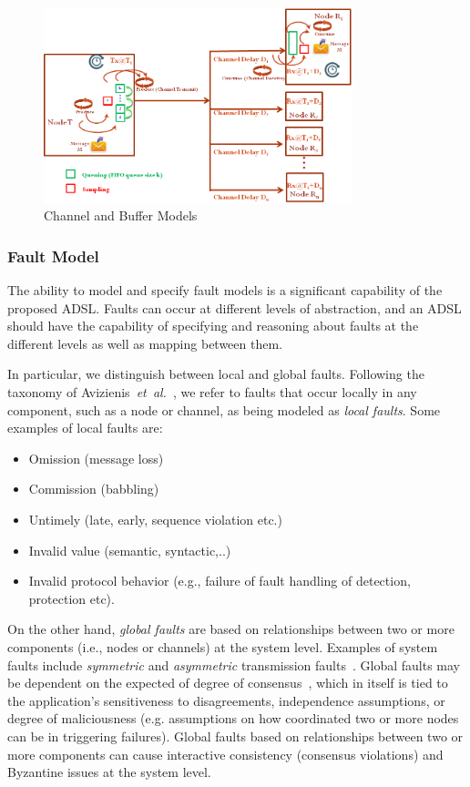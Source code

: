 \begin{figure}
\begin{center}
\includegraphics[width=0.8\textwidth]{figures/channel_buffer.png}
\caption{Channel and Buffer Models}
\label{fig:channel_buffer}
\end{center}
\end{figure}

\subsubsection{Fault Model}

The ability to model and specify fault models is a  significant capability
of the proposed ADSL. Faults can occur at different levels of abstraction, and an ADSL should have the capability of specifying and reasoning about faults at the different levels as well as mapping between them.

In particular, we distinguish between local and global faults.
Following the taxonomy of Avizienis~\emph{et~al.}~\cite{taxonomy},
we refer to faults that occur locally in any component, such as a node or channel, as being modeled as \emph{local faults}. Some examples of
local faults are:
\begin{itemize}
  \item Omission (message loss)
  \item Commission (babbling)
  \item Untimely (late, early, sequence violation etc.)
  \item Invalid value (semantic, syntactic,..)
  \item Invalid protocol behavior (e.g., failure of fault handling of detection,
protection etc).
\end{itemize}

On the other hand, \emph{global faults} are based on relationships between
two or more components (i.e., nodes or channels) at the system level. Examples of system
faults include \emph{symmetric} and \emph{asymmetric} transmission faults~\cite{Tha88:RDSS}. Global faults
may be dependent on the expected of degree of consensus~\cite{lynch}, which in itself is
tied to the application's sensitiveness to disagreements, independence assumptions, or degree of maliciousness (e.g. assumptions on how coordinated two or more nodes can be in triggering failures). Global faults based on relationships between two or more components can cause interactive consistency (consensus violations) and Byzantine issues at the system level.


